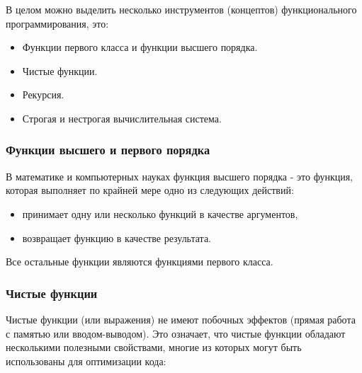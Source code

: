 В целом можно выделить несколько инструментов (концептов) функционального программирования, это:

\begin{itemize}
	\item Функции первого класса и функции высшего порядка.
	\item Чистые функции.
	\item Рекурсия.
	\item Строгая и нестрогая вычислительная система.
\end{itemize}

\subsubsection{Функции высшего и первого порядка}

В математике и компьютерных науках функция высшего порядка - это функция, которая выполняет по крайней мере одно из следующих действий:

\begin{itemize}
	\item принимает одну или несколько функций в качестве аргументов,
	\item возвращает функцию в качестве результата.
\end{itemize}

Все остальные функции являются функциями первого класса.

\subsubsection{Чистые функции}

Чистые функции (или выражения) не имеют побочных эффектов (прямая работа с памятью или вводом-выводом). 
Это означает, что чистые функции обладают несколькими полезными свойствами, многие из которых могут быть использованы для оптимизации кода:

